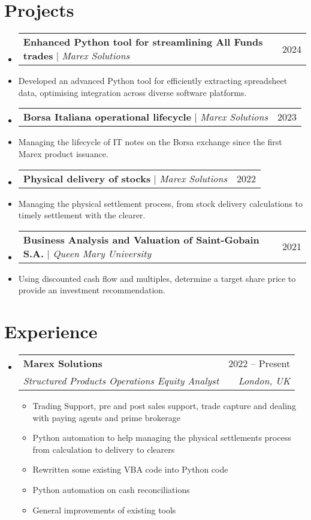 \documentclass[letterpaper,11pt]{article}
\makeatletter
\newcommand{\resumeItem}[1]{
  \item\small{
    {#1 \vspace{-2pt}}
  }
}
\newcommand{\resumeText}[1]{
  \item\small{
    {#1 \vspace{-2pt}}
  }
}
\newcommand{\resumeSubheading}[4]{
  \vspace{-2pt}\item
    \begin{tabular*}{0.97\textwidth}[t]{l@{\extracolsep{\fill}}r}
      \textbf{#1} & #2 \\
      \textit{\small#3} & \textit{\small #4} \\
    \end{tabular*}\vspace{-7pt}
}
\newcommand{\resumeProjectHeading}[2]{
    \item
    \begin{tabular*}{0.97\textwidth}{l@{\extracolsep{\fill}}r}
      \small#1 & #2 \\
    \end{tabular*}\vspace{-7pt}
}
\newcommand{\resumeSubHeadingListStart}{\begin{itemize}[leftmargin=0.15in, label={}]}
\newcommand{\resumeSubHeadingListEnd}{\end{itemize}}
\newcommand{\resumeItemListStart}{\begin{itemize}}
\newcommand{\resumeItemListEnd}{\end{itemize}\vspace{-5pt}}
\makeatother
\begin{document}
\section{Projects}
    \resumeSubHeadingListStart
      \resumeProjectHeading
        {\textbf{\href{https://github.com/marex}{\faGithub} Enhanced Python tool for streamlining All Funds trades} $|$ \emph{Marex Solutions}}{2024}
          \resumeText{Developed an advanced Python tool for efficiently extracting spreadsheet data, optimising integration across diverse software platforms.}
      \resumeProjectHeading
        {\textbf{\href{https://github.com/marex}{\faGithub} Borsa Italiana operational lifecycle} $|$ \emph{Marex Solutions}}{2023}
          \resumeText{Managing the lifecycle of IT notes on the Borsa exchange since the first Marex product issuance.}
      \resumeProjectHeading
        {\textbf{\href{https://github.com/marex}{\faGithub} Physical delivery of stocks} $|$ \emph{Marex Solutions}}{2022}
          \resumeText{Managing the physical settlement process, from stock delivery calculations to timely settlement with the clearer.}
      \resumeProjectHeading
        {\textbf{\href{https://github.com/deasatko/University/tree/main/Masters/Dissertation}{\faGithub} Business Analysis and Valuation of Saint-Gobain S.A.} $|$ \emph{Queen Mary University}}{2021}
          \resumeText{Using discounted cash flow and multiples, determine a target share price to provide an investment recommendation.} 
\resumeSubHeadingListEnd

\section{Experience}
  \resumeSubHeadingListStart

    \resumeSubheading
      {Marex Solutions}{2022 -- Present}
      {Structured Products Operations Equity Analyst}{London, UK}
      \resumeItemListStart
        \resumeItem{Trading Support, pre and post sales support, trade capture and dealing with paying agents and prime brokerage}
        \resumeItem{Python automation to help managing the physical settlements process from calculation to delivery to clearers}
        \resumeItem{Rewritten some existing VBA code into Python code}
        \resumeItem{Python automation on cash reconciliations}
        \resumeItem{General improvements of existing tools}
      \resumeItemListEnd

   \resumeSubHeadingListEnd

\end{document}
